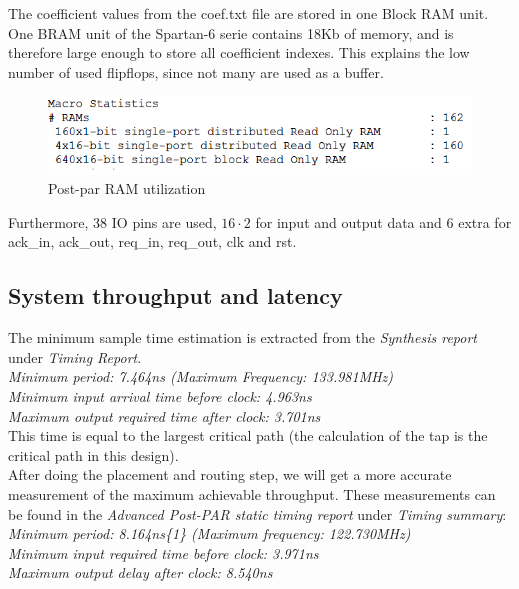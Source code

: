 \documentclass[a4paper,twoside,11pt, fleqn]{article}
\begin{document}
The coefficient values from the coef.txt file are stored in one Block RAM unit. One BRAM  unit of the Spartan-6 serie contains 18Kb of memory, and is therefore large enough to store all coefficient indexes. This explains the low number of used flipflops, since not many are used as a buffer.

\begin{figure}[h]
	\includegraphics[scale = 0.9]{Images/simulation_missingregisters}
    \caption{Post-par RAM utilization}
    \label{fig:RAM}
\end{figure}

Furthermore, 38 IO pins are used, $16\cdot 2$ for input and output data and 6 extra for ack\_in, ack\_out, req\_in, req\_out, clk and rst.

\newpage
\subsection{System throughput and latency}
\label{sec:thr4}
The minimum sample time estimation is extracted from the \textit{Synthesis report} under \textit{Timing Report}.\\

   \textit{Minimum period:  7.464ns (Maximum Frequency: 133.981MHz)\\
   Minimum input arrival time before clock: 4.963ns\\
   Maximum output required time after clock: 3.701ns}\\

This time is equal to the largest critical path (the calculation of the tap is the critical path in this design).\\

After doing the placement and routing step, we will get a more accurate measurement of the maximum achievable throughput. These measurements can be found in the \textit{Advanced Post-PAR static timing report} under \textit{Timing summary}:\\

\textit{Minimum period:   8.164ns\{1\}   (Maximum frequency: 122.730MHz)\\
   Minimum input required time before clock:   3.971ns\\
   Maximum output delay after clock:   8.540ns}\\
\end{document}
